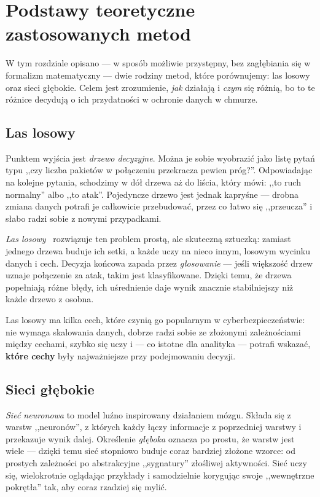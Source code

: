 \section{Podstawy teoretyczne zastosowanych metod}
\label{sec:podstawy}

W tym rozdziale opisano --- w sposób możliwie przystępny, bez zagłębiania się w
formalizm matematyczny --- dwie rodziny metod, które porównujemy: las losowy
oraz sieci głębokie. Celem jest zrozumienie, \emph{jak} działają i \emph{czym}
się różnią, bo to te różnice decydują o ich przydatności w ochronie danych w
chmurze.

\subsection{Las losowy}

Punktem wyjścia jest \emph{drzewo decyzyjne}. Można je sobie wyobrazić jako
listę pytań typu ,,czy liczba pakietów w połączeniu przekracza pewien próg?''.
Odpowiadając na kolejne pytania, schodzimy w dół drzewa aż do liścia, który
mówi: ,,to ruch normalny'' albo ,,to atak''. Pojedyncze drzewo jest jednak
kapryśne --- drobna zmiana danych potrafi je całkowicie przebudować, przez co
łatwo się ,,przeucza'' i słabo radzi sobie z nowymi przypadkami.

\emph{Las losowy}~\cite{breiman2001random} rozwiązuje ten problem prostą, ale
skuteczną sztuczką: zamiast jednego drzewa buduje ich setki, a każde uczy na
nieco innym, losowym wycinku danych i cech. Decyzja końcowa zapada przez
\emph{głosowanie} --- jeśli większość drzew uznaje połączenie za atak, takim
jest klasyfikowane. Dzięki temu, że drzewa popełniają różne błędy, ich
uśrednienie daje wynik znacznie stabilniejszy niż każde drzewo z osobna.

Las losowy ma kilka cech, które czynią go popularnym w cyberbezpieczeństwie:
nie wymaga skalowania danych, dobrze radzi sobie ze złożonymi zależnościami
między cechami, szybko się uczy i --- co istotne dla analityka --- potrafi
wskazać, \textbf{które cechy} były najważniejsze przy podejmowaniu decyzji.

\subsection{Sieci głębokie}

\emph{Sieć neuronowa} to model luźno inspirowany działaniem mózgu. Składa się z
warstw ,,neuronów'', z których każdy łączy informacje z poprzedniej warstwy i
przekazuje wynik dalej. Określenie \emph{głęboka} oznacza po prostu, że warstw
jest wiele --- dzięki temu sieć stopniowo buduje coraz bardziej złożone wzorce:
od prostych zależności po abstrakcyjne ,,sygnatury'' złośliwej aktywności.
Sieć uczy się, wielokrotnie oglądając przykłady i samodzielnie korygując swoje
,,wewnętrzne pokrętła'' tak, aby coraz rzadziej się mylić.

